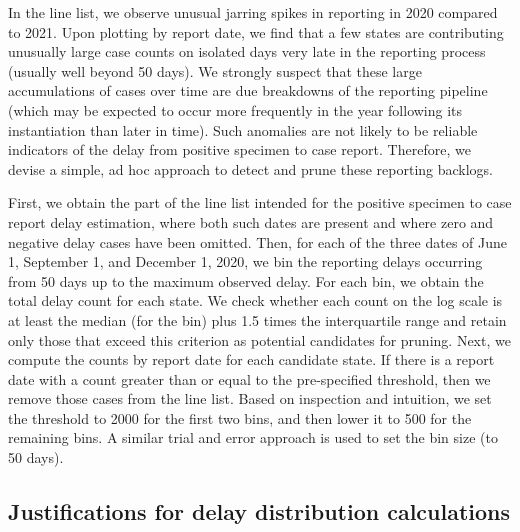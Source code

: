 \documentclass{article}
\begin{document}
In the line list, we observe unusual jarring spikes in reporting in 2020
compared to 2021. Upon plotting by report date, we find that a few states are
contributing unusually large case counts on isolated days very late in the
reporting process (usually well beyond 50 days). We strongly suspect that these
large accumulations of cases over time are due breakdowns of the reporting
pipeline (which may be expected to occur more frequently in the year following
its instantiation than later in time). Such anomalies are not likely to be
reliable indicators of the delay from positive specimen to case report.
Therefore, we devise a simple, ad hoc approach to detect and prune these
reporting backlogs.

First, we obtain the part of the line list intended for the positive specimen to
case report delay estimation, where both such dates are present and where zero
and negative delay cases have been omitted. Then, for each of the three dates of
June 1, September 1, and December 1, 2020, we bin the reporting delays occurring
from 50 days up to the maximum observed delay. For each bin, we obtain the total
delay count for each state. We check whether each count on the log scale is at
least the median (for the bin) plus 1.5 times the interquartile range and retain
only those that exceed this criterion as potential candidates for pruning. Next,
we compute the counts by report date for each candidate state. If there is a
report date with a count greater than or equal to the pre-specified threshold,
then we remove those cases from the line list. Based on inspection and
intuition, we set the threshold to 2000 for the first two bins, and then lower
it to 500 for the remaining bins. A similar trial and error approach is used to
set the bin size (to 50 days).

\subsection{Justifications for delay distribution calculations}
\label{sec:delay-justifications}
\end{document}
